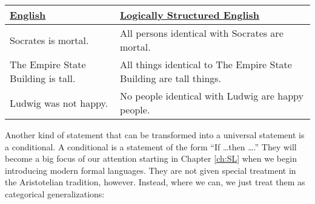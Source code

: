 \begin{table}[!ht]
\begin{longtabu}{p{.5\linewidth}p{.5\linewidth}}
\underline{English} & \underline{Logically Structured English} \\
\endhead
Socrates is mortal. & All persons identical with Socrates are mortal. \\
The Empire State Building is tall. & All things identical to The Empire State Building are tall things. \\
Ludwig was not happy. & No people identical with Ludwig are happy people. \\

\end{longtabu}
\end{table}


%
%
%
%
%
%
%

Another kind of statement that can be transformed into a universal statement is a conditional. A conditional is a statement of the form ``If \ldots then \ldots.'' They will become a big focus of our attention starting in Chapter \ref{ch:SL} when we begin introducing modern formal languages. They are not given special treatment in the Aristotelian tradition, however. Instead, where we can, we just treat them as categorical generalizations:

